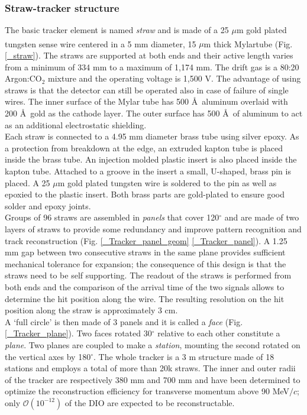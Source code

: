 \documentclass[12pt,a4paper,openright, oneside, titlepage]{book} %
\begin{document}
\subsubsection{Straw-tracker structure}
The basic tracker element is named \textit{straw} and is made of 
a 25 $\mu$m gold plated tungsten sense wire centered in a 5 mm diameter, 
15 $\mu$m thick Mylar\textsuperscript\textregistered  tube  (Fig. \ref{_straw}). 
The straws are supported at both ends and their active length varies from a minimum of 334 mm to a maximum of 1,174 mm.
The drift gas is a 80:20 Argon:CO$_2$ mixture and the operating voltage is 1,500 V. The advantage of using straws
is that the detector can still be operated also in case of failure of single wires.
The inner surface of the Mylar tube has 500 \AA\ aluminum overlaid with 200 \AA\ gold as the cathode layer. 
The outer surface has 500 \AA\ of aluminum to act as an additional electrostatic shielding.\\

\noindent
Each straw is connected to a 4.95 mm diameter brass tube using silver epoxy.
As a protection from breakdown at the edge, an extruded kapton tube is placed inside the brass tube. 
An injection molded plastic insert is also placed inside the kapton tube. 
Attached to a groove in the insert a small, U-shaped, brass pin is placed. 
A 25 $\mu$m gold plated tungsten wire is soldered to the pin as well as epoxied to the plastic insert. 
Both brass parts are gold-plated to ensure good solder and epoxy joints.  \\
Groups of 96 straws are assembled in \textit{panels} that cover 120$^\circ$ and are made of two layers of straws 
to provide some redundancy and improve pattern recognition and track reconstruction
(Fig. \ref{_Tracker_panel_geom} \ref{_Tracker_panel}).
 A 1.25 mm gap between two consecutive straws in the same plane 
 provides sufficient mechanical tolerance for expansion; 
 the consequence of this design is that the straws need to be self supporting. 
 The readout of the straws is performed from both ends and the comparison 
 of the arrival time of the two signals allows to determine the hit position along the wire. 
 The resulting resolution on the hit position along the straw is approximately 3 cm. \\
A `full circle' is then made of 3 panels and it is called a \textit{face} (Fig. \ref{_Tracker_plane}). 
Two faces rotated  30$^\circ$ relative to each other constitute a \textit{plane}. 
Two planes are coupled to make a \textit{station}, mounting the second rotated on the vertical axes by 180$^\circ$. 
The whole tracker is a 3 m structure made of 18 stations  and employs a total of more than 20k straws. 
The inner and outer radii of the tracker are respectively 380 mm and 700 mm and have been determined 
to optimize the reconstruction efficiency for transverse momentum above 90 MeV$/c$; 
only $\mathcal{O}(10^{-12})$ of the DIO are expected to be reconstructable\cite{Manolis}. \\
\end{document}
